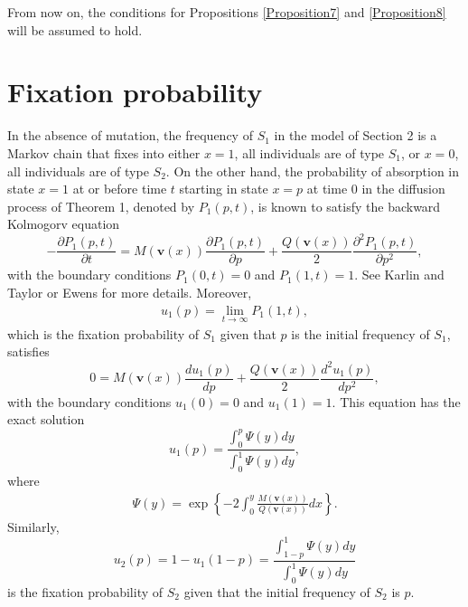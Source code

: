 \documentclass[11pt]{article}
\begin{document}
From now on, the conditions for Propositions \ref{Proposition7} and \ref{Proposition8} will be assumed to hold.

\section{Fixation probability}
In the absence of mutation, the frequency of $S_1$ in the model of Section 2 is a Markov chain that fixes into either $x=1$, all individuals are of type $S_1$, or $x=0$, all individuals are of type $S_2$. 
 On the other hand, the probability of absorption in state $x=1$ at or before time $t$ starting in state $x=p$ at time $0$ in the diffusion process of Theorem 1,  denoted by $P_1(p, t)$, is known to satisfy the backward Kolmogorv equation
\begin{equation}\label{sec4-eq1}
-\frac{\partial P_1(p,t)}{\partial t}=M(\mathbf{v}(x))\frac{\partial P_1(p,t)}{\partial p}+
\frac{Q(\mathbf{v}(x))}{2}\frac{\partial^2P_1(p,t)}{\partial p^2},
\end{equation}
with the boundary conditions $P_1(0,t)=0$ and $P_1(1,t)=1$. See Karlin and Taylor \cite{KT1981} or Ewens \cite{E2004} for more details. Moreover, 
\begin{align}
u_1(p)=\lim_{t\rightarrow\infty}P_1(1,t),
\end{align}
which is the fixation probability of $S_1$ given that $p$ is  the initial frequency of $S_1$, 
satisfies
\begin{equation}\label{sec4-eq2}
0=M(\mathbf{v}(x))\frac{d u_1(p)}{d p}+
\frac{Q(\mathbf{v}(x))}{2}\frac{d^2u_1(p)}{d p^2},
\end{equation}
with the boundary conditions $u_1(0)=0$ and $u_1(1)=1$. This equation has the exact solution
\begin{equation}\label{sec4-eq3}
u_1(p)=\frac{\int_{0}^p\Psi(y)dy}{\int_{0}^1\Psi(y)dy},
\end{equation}
where 
\begin{align}\label{sec4-eq4}
\Psi(y)=\exp\left\{-2\int_{0}^{y}\frac{M(\mathbf{v}(x))}{Q(\mathbf{v}(x))} dx\right\}.
\end{align}
Similarly, 
\begin{equation}\label{sec4-eq5}
u_2(p)=1-u_1(1-p)=\frac{\int_{1-p}^1\Psi(y)dy}{\int_{0}^1\Psi(y)dy}
\end{equation}
is the fixation probability of $S_2$ given that the initial frequency of $S_2$ is $p$.
\end{document}
